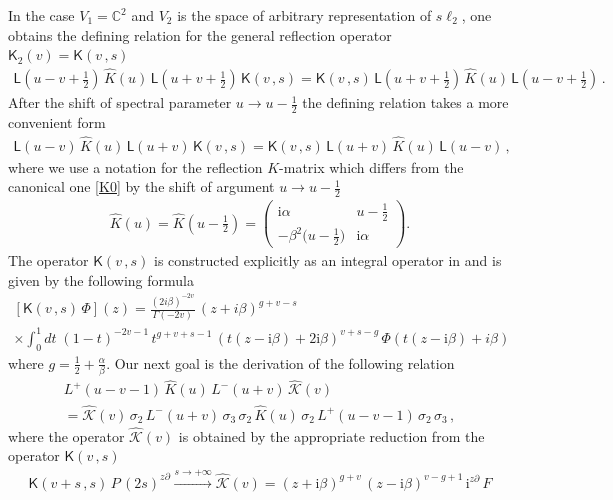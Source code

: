 \documentclass[11pt]{article}
\numberwithin{equation}{section}
\theoremstyle{plain}
\theoremstyle{definition}
\newcommand{\K}{\mathsf{K}}
\renewcommand{\imath}{\mathrm{i}}
\begin{document}
In the case $V_1 = \mathbb{C}^2$ and $V_2$ 
is the space of arbitrary representation of $s\ell_2$,
one obtains the defining relation for the general 
reflection operator $\K_2(v) = \K(v\,,s)$ 
\begin{align} \nonumber
	\textstyle \mathsf{L}(u-v+\frac{1}{2})\,\widehat{K}(u)\,
	\mathsf{L}(u+v+\frac{1}{2})\,\K(v\,,s) = 
	\K(v\,,s)\,\mathsf{L}(u+v+\frac{1}{2})\,\widehat{K}(u)\,
	\mathsf{L}(u-v+\frac{1}{2}) \,.
\end{align}
After the shift of spectral parameter $u \to u - \frac{1}{2}$ the defining relation takes a more convenient form
\begin{align} \label{ReflK-0}
	\mathsf{L}(u-v)\,\hat{K}(u)\,\mathsf{L}(u+v)\,\K(v\,,s) = 
	\K(v\,,s)\,\mathsf{L}(u+v)\,\hat{K}(u)\,\mathsf{L}(u-v) \,,
\end{align}
where we use a notation for the reflection $K$-matrix which differs from the canonical one \eqref{K0} by the shift of 
argument $u\to u-\frac{1}{2}$
\begin{align}\label{KX}
	\hat{K}(u) = \textstyle \widehat{K}(u-\frac{1}{2}) =  
	\begin{pmatrix}
		\imath \alpha & u - \frac{1}{2} \\[6pt]
		- \beta^2 \bigl(u - \frac{1}{2} \bigr) & \imath\alpha
	\end{pmatrix}.
\end{align}
The operator $\K(v\,,s)$ is constructed explicitly as an integral operator in \cite{ABDK} 
and is given by the following formula 
\begin{multline}\label{Kvs}
	\left[\K(v\,,s)\,\Phi\right](z) = \frac{(2i\beta)^{-2v}}{\Gamma(-2v)}\,(z+i\beta)^{g+v-s}\\
	\times \int_0^1 d t\;(1-t)^{-2v-1}\,t^{g+v+s-1}\,
	\left(t(z-\imath \beta)+2\imath\beta\right)^{v+s-g}\,\Phi(t(z-\imath\beta)+i\beta) 
\end{multline}
where $g = \frac{1}{2}+\frac{\alpha}{\beta}$.
Our next goal is the derivation of the following relation  
\begin{multline}\label{hatK}
	L^{+}(u-v-1)\,\hat{K}(u)\,L^{-}(u+v)\,\hat{\mathcal{K}}(v) \\
	= \hat{\mathcal{K}}(v)\,\sigma_2\,L^{-}(u+v)\,\sigma_3\,\sigma_2\,
	\hat{K}(u)\,\sigma_2\,L^{+}(u-v-1)\,\sigma_2\,\sigma_3 \,,
\end{multline}
where the operator $\hat{\mathcal{K}}(v)$ is obtained by the appropriate 
reduction from the operator $\K(v\,,s)$
\begin{align}\label{Kv}
	\K(v+s\,,s)\,P\,(2s)^{z\partial}  
	\xrightarrow{s \to +\infty}  \hat{\mathcal{K}}(v) = 
	(z+\imath\beta)^{g+v}\,(z-\imath \beta)^{v-g+1}\,
	\imath^{z\partial}\,F  
\end{align}
\end{document}
